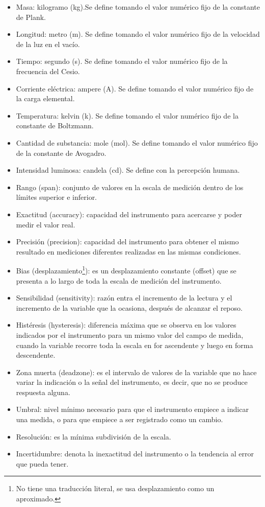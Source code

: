 \documentclass[12pt, letterpaper]{extarticle}
\begin{document}

\begin{itemize}
    \item Masa: kilogramo (kg).Se define tomando el valor numérico fijo de la constante de Plank.
    \item Longitud: metro (m). Se define tomando el valor numérico fijo de la velocidad de la luz en el vacío.
    \item Tiempo: segundo (s). Se define tomando el valor numérico fijo de la frecuencia del Cesio.
    \item Corriente eléctrica: ampere (A). Se define tomando el valor numérico fijo de la carga elemental.
    \item Temperatura: kelvin (k). Se define tomando el valor numérico fijo de la constante de Boltzmann.
    \item Cantidad de substancia: mole (mol). Se define tomando el valor numérico fijo de la constante de Avogadro.
    \item Intensidad luminosa: candela (cd). Se define con la percepción humana.
\end{itemize}


\begin{itemize}
    \item Rango (span): conjunto de valores en la escala de medición dentro de los límites superior e inferior.
    \item Exactitud (accuracy): capacidad del instrumento para acercarse y poder medir el valor real.
    \item Precisión (precision): capacidad del instrumento para obtener el mismo resultado en mediciones diferentes realizadas en las mismas condiciones.
    \item Bias (desplazamiento\footnote{No tiene una traducción literal, se usa desplazamiento como un aproximado.}): es un desplazamiento constante (offset) que se presenta a lo largo de toda la escala de medición del instrumento.
    \item Sensibilidad (sensitivity): razón entra el incremento de la lectura y el incremento de la variable que la ocasiona, después de alcanzar el reposo.
    \item Histéresis (hysteresis): diferencia máxima que se observa en los valores indicados por el instrumento para un mismo valor del campo de medida, cuando la variable recorre toda la escala en for ascendente y luego en forma descendente.
    \item Zona muerta (deadzone): es el intervalo de valores de la variable que no hace variar la indicación o la señal del instrumento, es decir, que no se produce respuesta alguna.
    \item Umbral: nivel mínimo necesario para que el instrumento empiece a indicar una medida, o para que empiece a ser registrado como un cambio.
    \item Resolución: es la mínima subdivisión de la escala.
    \item Incertidumbre: denota la inexactitud del instrumento o la tendencia al error que pueda tener.
\end{itemize}
\end{document}
